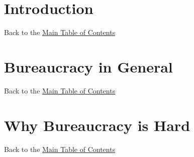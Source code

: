 \documentclass[openright]{book}
\begin{document}
\chapter{Introduction\label{sec:introduction}}
{\footnotesize Back to the \hyperref[sec:toc]{Main Table of Contents}}
\minitoc
  
   \clearpage
   \clearpage
    \clearpage
  
      \clearpage%
      \clearpage
      \clearpage%
     \clearpage
     \clearpage
     \clearpage
      \clearpage%
  \clearpage
  \clearpage 

\chapter{Bureaucracy in General\label{sec:bureaucracy-in-general}}
{\footnotesize Back to the \hyperref[sec:toc]{Main Table of Contents}}
\minitoc
   \clearpage
   \clearpage
   \clearpage
   \clearpage
   \clearpage 
   \clearpage
   \clearpage
   \clearpage
   \clearpage
   \clearpage

\chapter{Why Bureaucracy is Hard\label{sec:why-bur-hard}}
  {\footnotesize Back to the \hyperref[sec:toc]{Main Table of Contents}}
  \minitoc
   \clearpage
   \clearpage
   \clearpage    
\end{document}
